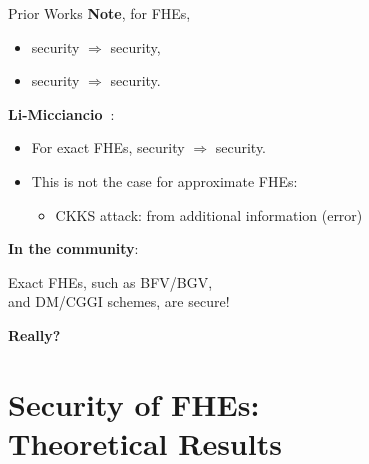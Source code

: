 \documentclass[handout]{beamer}
\begin{document}
    \begin{frame}{Prior Works}
    \small
    {\bf Note}, for FHEs,
        \begin{itemize}
            \item \indcpad security $\Rightarrow$ \indcpa security, 
            \item \indcpad security $\Rightarrow$ \krd security.
        \end{itemize}\vspace{0.2cm}\pause
    
	{\bf Li-Micciancio~\cite{EC:LiMic21}}: 
    \begin{itemize}
        \item For exact FHEs, \indcpa security $\Rightarrow$ \indcpad security.
        \item This is not the case for approximate FHEs: 
        \begin{itemize}
            \item CKKS \krd attack: from additional information (error)
        \end{itemize}
    \end{itemize}\vspace{0.2cm}\pause

    {\bf In the community}: 
    \begin{center}
        Exact FHEs, such as BFV/BGV,\\ and DM/CGGI schemes, are \indcpad secure!
    \end{center}
    \end{frame}

    
    \begin{frame}{}
    \begin{center}
        {\Huge \bf Really?}
    \end{center} 
    \end{frame}

\section{\indcpad Security of FHEs:\\ {\normalsize Theoretical Results}}
\end{document}
